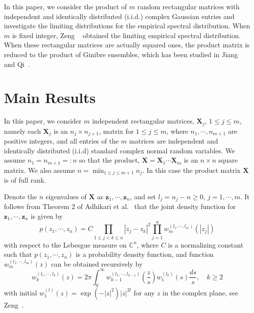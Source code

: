 \documentclass[12pt]{article}
\theoremstyle{plain}
\theoremstyle{definition}
\theoremstyle{remark}
\begin{document}
In this paper, we consider the product of $m$ random rectangular
matrices with independent and identically distributed (i.i.d.)
complex Gaussian entries and investigate the limiting distributions
for the empirical spectral distribution. When $m$ is fixed integer,
Zeng ~\cite{zeng2016} obtained the limiting empirical spectral
distribution. When these rectangular matrices are actually squared
ones, the product matrix is reduced to the product of Ginibre
ensembles, which has been studied in Jiang and
Qi~\cite{JiangQi2019}.


\section{Main Results}\label{sec:main}
In this paper, we consider $m$ independent rectangular matrices, $\mathbf{X}_j$, $1\leq j \leq m$, namely each $\mathbf{X}_j$ is an $n_j\times n_{j+1}$, matrix for $1\leq j\leq m$, where $n_1,\cdots, n_{m+1}$ are positive integers, and all entries of the $m$ matrices are independent and identically distributed (i.i.d) standard complex normal random variables. We assume $n_1=n_{m+1}=:n$ so that the product, $\mathbf{X}=\mathbf{X}_1 \cdots \mathbf{X}_{m}$ is an $n\times n$ square matrix. We also assume $n=\min_{1\leq j\leq m+1}n_j$. In this case the product matrix $\mathbf{X}$ is of full rank.

Denote the $n$ eigenvalues of $\mathbf{X}$ as $\mathbf{z}_{1},
\cdots, \mathbf{z}_{n}$, and set $l_{j}=n_{j}-n\geq 0$, $j=1,
\cdots, m$. It follows from Theorem 2 of Adhikari et
al.~\cite{Adhikari} that the joint density function for
$\mathbf{z}_{1}, \cdots, \mathbf{z}_{n}$ is given by
\begin{equation*}
p\left({z}_{1}, \cdots, {z}_{n}\right)=C \prod_{1 \leq j<k \leq
n}\left|{z}_{j}-{z}_{k}\right|^{2} \prod_{j=1}^{n}
w_{m}^{\left(l_{1}, \cdots,
l_{m}\right)}\left(\left|z_{j}\right|\right)
\end{equation*}
with
respect to the Lebesgue measure on $\mathbb{C}^{n}$, where $C$ is a
normalizing constant such that $p(z_1,\cdots, z_n)$ is a probability
density function, and function $w_{m}^{\left(l_{1}, \cdots,
l_{m}\right)}(z)$ can be obtained recursively by
\begin{equation*}
w_{k}^{\left(l_{1}, \cdots, l_{k}\right)}(z)=2 \pi \int_{0}^{\infty}
w_{k-1}^{\left(l_{1}, \cdots,
l_{k-1}\right)}\left(\frac{z}{s}\right)
w_{1}^{\left(l_{k}\right)}(s) \frac{d s}{s}, \quad k \geq 2
\end{equation*} with initial $w_{1}^{(l)}(z)=\exp
\left(-|z|^{2}\right)|z|^{2 l}$ for any $z$ in the complex plane,
see Zeng~\cite{zeng2016}.
\end{document}
